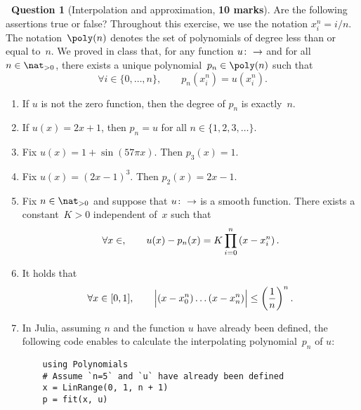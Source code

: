\documentclass[10pt]{article}
\theoremstyle{definition}
\newtheorem{question}{{\normalfont \faGears}~Question}
\theoremstyle{remark}
\begin{document}
\newpage
\begin{question}
    [Interpolation and approximation, \textbf{10 marks}]
    Are the following assertions true or false?
    Throughout this exercise, we use the notation
    $x^n_i = i/n$.
    The notation~$\poly(n)$ denotes the set of polynomials of degree less than or equal to~$n$.
    We proved in class that,
    for any function $u \colon \real \to \real$ and for all $n \in \nat_{>0}$,
    there exists a unique polynomial~$p_n \in \poly(n)$ such that
    \begin{equation}
        \label{eq:interpolation}
        \forall i \in \{0, \dotsc, n\}, \qquad
        p_n(x^n_i) = u (x^n_i).
    \end{equation}

    \begin{enumerate}
        \item
            If $u$ is not the zero function,
            then the degree of $p_n$ is exactly~$n$.

        \item
            If $u(x) = 2x + 1$,
            then $p_n = u$ for all $n \in \{1, 2, 3, \dotsc\}$.

        \item
            Fix $u(x) = 1 + \sin(57\pi x)$. Then $p_3(x) = 1$.

        \item
            Fix $u(x) = (2x - 1)^3$.
            Then $p_2(x) = 2x - 1$.

        \item
            Fix $n \in \nat_{>0}$ and suppose that $u\colon \real \to \real$ is a smooth function.
            There exists a constant~$K > 0$ independent of~$x$ such that
            \[
                \forall x \in \real,
                \qquad u(x) - p_n(x) = K \prod_{i=0}^{n} \left(x - x^n_i\right).
            \]

        \item
            It holds that
            \[
                \forall x \in [0, 1], \qquad
                \Bigl\lvert (x - x^n_0) \dotsc (x - x^n_n) \Bigr\rvert \leq \left(\frac{1}{n}\right)^n.
            \]

        \item
            In Julia, assuming $n$ and the function $u$ have already been defined,
            the following code enables to calculate the interpolating polynomial~$p_n$ of $u$:
            \begin{verbatim}
    using Polynomials
    # Assume `n=5` and `u` have already been defined
    x = LinRange(0, 1, n + 1)
    p = fit(x, u)
            \end{verbatim}


\end{enumerate}
\end{question}
\end{document}
